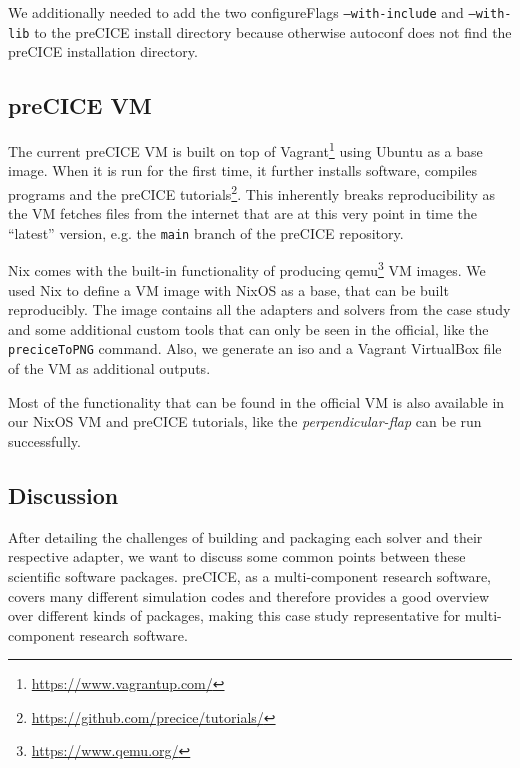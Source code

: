 \documentclass[conference,final,a4paper]{IEEEtran}
\begin{document}
We additionally needed to add the two configureFlags \texttt{--with-include} and \texttt{--with-lib} to the preCICE install directory because otherwise autoconf does not find the preCICE installation directory.

\subsection{preCICE VM}

The current preCICE VM is built on top of Vagrant\footnote{\url{https://www.vagrantup.com/}} using Ubuntu as a base image.
When it is run for the first time, it further installs software, compiles programs and the preCICE tutorials\footnote{\url{https://github.com/precice/tutorials/}}.
This inherently breaks reproducibility as the VM fetches files from the internet that are at this very point in time the ``latest'' version, e.g. the \texttt{main} branch of the preCICE repository.

Nix comes with the built-in functionality of producing qemu\footnote{\url{https://www.qemu.org/}} VM images.
We used Nix to define a VM image with NixOS as a base, that can be built reproducibly.
The image contains all the adapters and solvers from the case study and some additional custom tools that can only be seen in the official, like the \texttt{preciceToPNG} command.
Also, we generate an iso and a Vagrant VirtualBox file of the VM as additional outputs.

Most of the functionality that can be found in the official VM is also available in our NixOS VM and preCICE tutorials, like the \textit{perpendicular-flap} can be run successfully.

\subsection{Discussion}

After detailing the challenges of building and packaging each solver and their respective adapter, we want to discuss some common points between these scientific software packages.
preCICE, as a multi-component research software, covers many different simulation codes and therefore provides a good overview over different kinds of packages, making this case study representative for multi-component research software.\\
\end{document}
